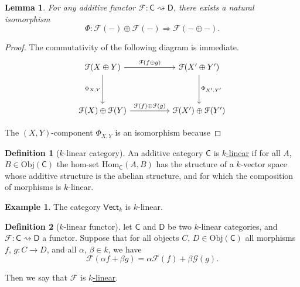 \documentclass[a4paper]{report}
\newcommand{\defn}[1]{\ul{#1}}
\newcommand{\Obj}{\mathrm{Obj}}
\newcommand{\Hom}{\mathrm{Hom}}
\theoremstyle{definition}
\newtheorem{definition}{Definition}[section]
\newtheorem{example}{Example}[section]
\theoremstyle{plain}
\newtheorem{lemma}{Lemma}[section]
\theoremstyle{remark}
\begin{document}
\begin{lemma}
  For any additive functor $\mathcal{F}\colon \mathsf{C} \rightsquigarrow \mathsf{D}$, there exists a natural isomorphism 
  \begin{equation*}
    \Phi\colon \mathcal{F}(-) \oplus \mathcal{F}(-) \Rightarrow \mathcal{F}(- \oplus -).
  \end{equation*}
\end{lemma}
\begin{proof}
  The commutativity of the following diagram is immediate.
  \begin{equation*}
    \begin{tikzcd}[column sep=huge, row sep=huge]
      \mathcal{F}(X \oplus Y)
      \arrow[r, "\mathcal{F}(f \oplus g)"]
      \arrow[d, swap, "\Phi_{X, Y}"]
      & \mathcal{F}(X' \oplus Y')
      \arrow[d, "\Phi_{X', Y'}"]
      \\
      \mathcal{F}(X) \oplus \mathcal{F}(Y)
      \arrow[r, "\mathcal{F}(f) \oplus \mathcal{F}(g)"]
      & \mathcal{F}(X') \oplus \mathcal{F}(Y')
    \end{tikzcd}
  \end{equation*}

  The $(X, Y)$-component $\Phi_{X, Y}$ is an isomorphism because
\end{proof}

\begin{definition}[$k$-linear category]
  \label{def:linearcategory}
  An additive category $\mathsf{C}$ is \defn{$k$-linear} if for all $A$, $B \in \Obj(\mathsf{C})$ the hom-set $\Hom_{\mathsf{C}}(A, B)$ has the structure of a $k$-vector space whose additive structure is the abelian structure, and for which the composition of morphisms is $k$-linear.
\end{definition}

\begin{example}
  The category $\mathsf{Vect}_{k}$ is $k$-linear.
\end{example}

\begin{definition}[$k$-linear functor]
  \label{def:linearfunctor}
  let $\mathsf{C}$ and $\mathsf{D}$ be two $k$-linear categories, and $\mathcal{F}\colon \mathsf{C} \rightsquigarrow \mathsf{D}$ a functor. Suppose that for all objects $C$, $D \in \Obj(\mathsf{C})$ all morphisms $f$, $g\colon C \to D$, and all $\alpha$, $\beta \in k$, we have
  \begin{equation*}
    \mathcal{F}(\alpha f + \beta g) = \alpha \mathcal{F}(f) + \beta \mathcal{G}(g).
  \end{equation*}

  Then we say that $\mathcal{F}$ is \defn{$k$-linear}.
\end{definition}
\end{document}
